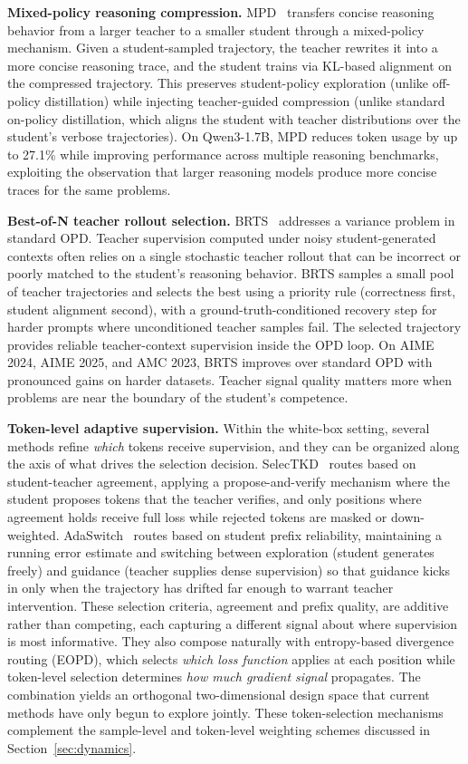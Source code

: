 \documentclass{article} %
\begin{document}
\textbf{Mixed-policy reasoning compression.} MPD~\citep{2605.08776} transfers concise reasoning behavior from a larger teacher to a smaller student through a mixed-policy mechanism. Given a student-sampled trajectory, the teacher rewrites it into a more concise reasoning trace, and the student trains via KL-based alignment on the compressed trajectory. This preserves student-policy exploration (unlike off-policy distillation) while injecting teacher-guided compression (unlike standard on-policy distillation, which aligns the student with teacher distributions over the student's verbose trajectories). On Qwen3-1.7B, MPD reduces token usage by up to 27.1\% while improving performance across multiple reasoning benchmarks, exploiting the observation that larger reasoning models produce more concise traces for the same problems.

\textbf{Best-of-N teacher rollout selection.} BRTS~\citep{2605.09725} addresses a variance problem in standard OPD. Teacher supervision computed under noisy student-generated contexts often relies on a single stochastic teacher rollout that can be incorrect or poorly matched to the student's reasoning behavior. BRTS samples a small pool of teacher trajectories and selects the best using a priority rule (correctness first, student alignment second), with a ground-truth-conditioned recovery step for harder prompts where unconditioned teacher samples fail. The selected trajectory provides reliable teacher-context supervision inside the OPD loop. On AIME 2024, AIME 2025, and AMC 2023, BRTS improves over standard OPD with pronounced gains on harder datasets. Teacher signal quality matters more when problems are near the boundary of the student's competence.

\textbf{Token-level adaptive supervision.} Within the white-box setting, several methods refine \emph{which} tokens receive supervision, and they can be organized along the axis of what drives the selection decision. SelecTKD~\citep{2510.24021} routes based on student-teacher agreement, applying a propose-and-verify mechanism where the student proposes tokens that the teacher verifies, and only positions where agreement holds receive full loss while rejected tokens are masked or down-weighted. AdaSwitch~\citep{2510.07842} routes based on student prefix reliability, maintaining a running error estimate and switching between exploration (student generates freely) and guidance (teacher supplies dense supervision) so that guidance kicks in only when the trajectory has drifted far enough to warrant teacher intervention. These selection criteria, agreement and prefix quality, are additive rather than competing, each capturing a different signal about where supervision is most informative. They also compose naturally with entropy-based divergence routing (EOPD), which selects \emph{which loss function} applies at each position while token-level selection determines \emph{how much gradient signal} propagates. The combination yields an orthogonal two-dimensional design space that current methods have only begun to explore jointly. These token-selection mechanisms complement the sample-level and token-level weighting schemes discussed in Section~\ref{sec:dynamics}.
\end{document}
